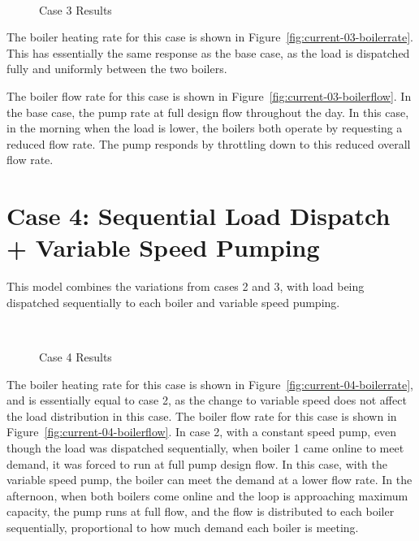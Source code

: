 \documentclass{report}
\begin{document}
      \begin{figure*}[hbt]
        \centering
        ~
        \caption{Case 3 Results}
      \end{figure*}

      The boiler heating rate for this case is shown in Figure~\ref{fig:current-03-boilerrate}.
      This has essentially the same response as the base case, as the load is dispatched fully and uniformly between the two boilers.

      The boiler flow rate for this case is shown in Figure~\ref{fig:current-03-boilerflow}.
      In the base case, the pump rate at full design flow throughout the day.
      In this case, in the morning when the load is lower, the boilers both operate by requesting a reduced flow rate.
      The pump responds by throttling down to this reduced overall flow rate.

    \section{Case 4: Sequential Load Dispatch + Variable Speed Pumping}\label{sec:current-04}

      This model combines the variations from cases 2 and 3, with load being dispatched sequentially to each boiler and variable speed pumping.

      \begin{figure*}[hbt]
        \centering
        ~
        \caption{Case 4 Results}
      \end{figure*}

      The boiler heating rate for this case is shown in Figure~\ref{fig:current-04-boilerrate}, and is essentially equal to case 2, as the change to variable speed does not affect the load distribution in this case.
      The boiler flow rate for this case is shown in Figure~\ref{fig:current-04-boilerflow}.
      In case 2, with a constant speed pump, even though the load was dispatched sequentially, when boiler 1 came online to meet demand, it was forced to run at full pump design flow.
      In this case, with the variable speed pump, the boiler can meet the demand at a lower flow rate.
      In the afternoon, when both boilers come online and the loop is approaching maximum capacity, the pump runs at full flow, and the flow is distributed to each boiler sequentially, proportional to how much demand each boiler is meeting.
\end{document}
